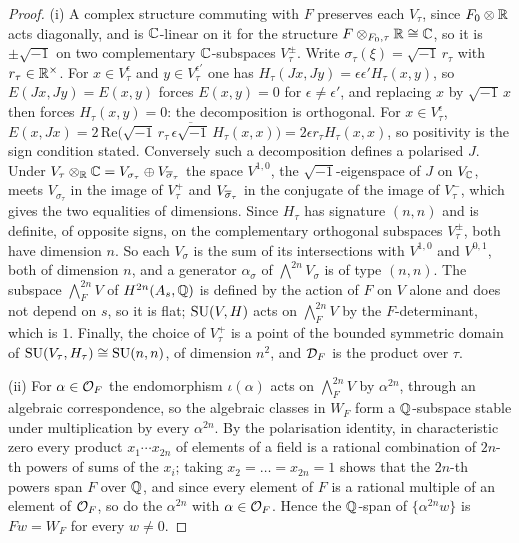 \begin{proof}
(i) A complex structure commuting with $F$ preserves each $V_{\tau}$, since
$F_{0}\otimes\mathbb{R}$ acts diagonally, and is $\mathbb{C}$-linear on it for the
structure $F\otimes_{F_{0},\tau}\mathbb{R}\cong\mathbb{C}$, so it is $\pm\sqrt{-1}$ on two
complementary $\mathbb{C}$-subspaces $V_{\tau}^{\pm}$. Write
$\sigma_{\tau}(\xi)=\sqrt{-1}\,r_{\tau}$ with $r_{\tau}\in\mathbb{R}^{\times}$. For
$x\in V^{\epsilon}_{\tau}$ and $y\in V^{\epsilon'}_{\tau}$ one has
$H_{\tau}(Jx,Jy)=\epsilon\epsilon'H_{\tau}(x,y)$, so
$E(Jx,Jy)=E(x,y)$ forces $E(x,y)=0$ for $\epsilon\ne\epsilon'$, and replacing
$x$ by $\sqrt{-1}\,x$ then forces $H_{\tau}(x,y)=0$: the decomposition is
orthogonal. For $x\in V^{\epsilon}_{\tau}$,
$E(x,Jx)=2\,\mathrm{Re}\bigl(\sqrt{-1}\,r_{\tau}\,
\overline{\epsilon\sqrt{-1}}\,H_{\tau}(x,x)\bigr)=2\epsilon r_{\tau}H_{\tau}(x,x)$,
so positivity is the sign condition stated. Conversely such a decomposition
defines a polarised $J$. Under $V_{\tau}\otimes_{\mathbb{R}}\mathbb{C}=V_{\sigma_{\tau}}
\oplus V_{\overline{\sigma}_{\tau}}$ the space $V^{1,0}$, the $\sqrt{-1}$-eigenspace
of $J$ on $V_{\mathbb{C}}$, meets $V_{\sigma_{\tau}}$ in the image of $V_{\tau}^{+}$
and $V_{\overline{\sigma}_{\tau}}$ in the conjugate of the image of $V_{\tau}^{-}$,
which gives the two equalities of dimensions. Since $H_{\tau}$ has signature
$(n,n)$ and is definite, of opposite signs, on the complementary orthogonal
subspaces $V_{\tau}^{\pm}$, both have dimension $n$. So each $V_{\sigma}$ is
the sum of its intersections with $V^{1,0}$ and $V^{0,1}$, both of dimension
$n$, and a generator $\alpha_{\sigma}$ of $\bigwedge^{2n}V_{\sigma}$ is of
type $(n,n)$. The subspace $\bigwedge^{2n}_{F}V$ of $H^{2n}(A_{s},\mathbb{Q})$ is
defined by the action of $F$ on $V$ alone and does not depend on $s$, so it
is flat; $\operatorname{SU}(V,H)$ acts on $\bigwedge^{2n}_{F}V$ by the $F$-determinant,
which is $1$. Finally, the choice of $V_{\tau}^{+}$ is a point of the bounded
symmetric domain of $\operatorname{SU}(V_{\tau},H_{\tau})\cong\operatorname{SU}(n,n)$, of dimension
$n^{2}$, and $\mathcal{D}_{F}$ is the product over $\tau$.

(ii) For $\alpha\in\mathcal{O}_{F}$ the endomorphism $\iota(\alpha)$ acts on
$\bigwedge^{2n}_{F}V$ by $\alpha^{2n}$, through an algebraic correspondence,
so the algebraic classes in $W_{F}$ form a $\mathbb{Q}$-subspace stable under
multiplication by every $\alpha^{2n}$. By the polarisation identity, in
characteristic zero every product $x_{1}\cdots x_{2n}$ of elements of a field
is a rational combination of $2n$-th powers of sums of the $x_{i}$; taking
$x_{2}=\dots=x_{2n}=1$ shows that the $2n$-th powers span $F$ over $\mathbb{Q}$, and
since every element of $F$ is a rational multiple of an element of $\mathcal{O}_{F}$,
so do the $\alpha^{2n}$ with $\alpha\in\mathcal{O}_{F}$. Hence the $\mathbb{Q}$-span of
$\{\alpha^{2n}w\}$ is $Fw=W_{F}$ for every $w\ne0$.


\end{proof}
